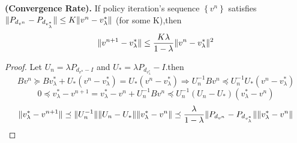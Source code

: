 \begin{theorem}
    \textbf{(Convergence Rate).}
    If policy iteration's sequence $ \left\{ v^n \right\} $ satisfies
    $ \Arrowvert P_{d_{v^n}} - P_{d_{v^*_{\lambda}}} \Arrowvert \le K \Arrowvert v^n - v^*_\lambda \Arrowvert $ (for some K),then
    \[
        \Arrowvert v^{n+1} - v^*_{\lambda} \Arrowvert \le \frac{K\lambda}{1-\lambda} \Arrowvert v^n - v^*_\lambda \Arrowvert^2
    \]
    \begin{proof}
        Let $ U_n = \lambda P_{d_{v^{n}}-I} $ and $ U_* = \lambda P_{d_{v^*_\lambda}} - I $.then
        \[
            Bv^n \succeq B v^*_\lambda + U_* (v^n - v^*_\lambda) = U_* (v^n - v^*_\lambda)
            \Rightarrow
            U^{-1}_{n} B v^n \preceq U^{-1}_n U_* (v^n - v^*_\lambda)
        \]
        \[
            0 \preceq v^*_\lambda - v^{n+1} = v^*_\lambda - v^n + U^{-1}_{n}B v^n
            \preceq U^{-1}_n (U_n - U_*)(v^*_\lambda - v^n)
        \]
        \[
            \Arrowvert v^*_{\lambda} - v^{n+1} \Arrowvert \preceq \Arrowvert U^{-1}_{n} \Arrowvert
            \Arrowvert U_n - U_* \Arrowvert \Arrowvert v^*_{\lambda} - v^n \Arrowvert \preceq \frac{\lambda}{1-\lambda} \Arrowvert P_{d_{v^n}} - P_{d_{v^*_{\lambda}}} \Arrowvert \Arrowvert v^*_\lambda - v^n \Arrowvert
        \]
    \end{proof}
\end{theorem}


